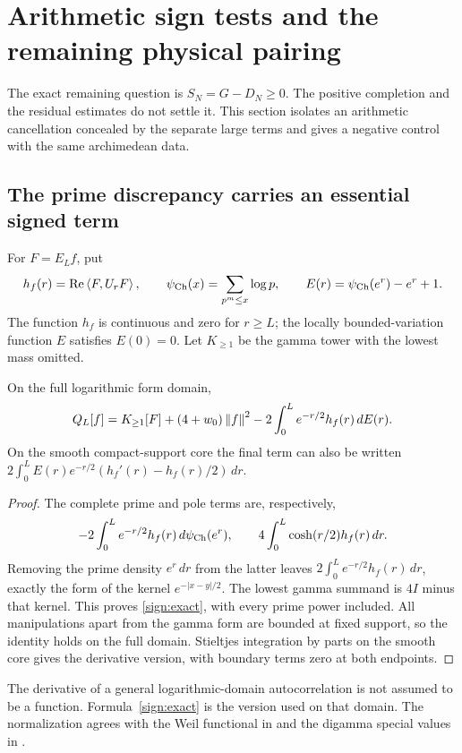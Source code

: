 \section{Arithmetic sign tests and the remaining physical pairing}
\label{sec:outlook}
The exact remaining question is $S_N=G-D_N\ge0$. The positive
completion and the residual estimates do not settle it. This section
isolates an arithmetic cancellation concealed by the separate large
terms and gives a negative control with the same archimedean data.

\subsection{The prime discrepancy carries an essential signed term}
For $F=E_Lf$, put
\[
h_f(r)=\operatorname{Re}\left\langle F,U_rF\right\rangle,\qquad
\psi_{\rm Ch}(x)=\sum_{p^m\le x}\log p,\qquad
E(r)=\psi_{\rm Ch}(e^r)-e^r+1.
\]
The function $h_f$ is continuous and zero for $r\ge L$; the locally
bounded-variation function $E$ satisfies $E(0)=0$.
Let $K_{\ge1}$ be the gamma tower with the lowest mass omitted.

\begin{proposition}\label{sign:discrepancy}
On the full logarithmic form domain,
\begin{equation}\label{sign:exact}
Q_L[f]=K_{\ge1}[F]+(4+w_0)\left\lVert f\right\rVert^2
       -2\int_0^L e^{-r/2}h_f(r)\,dE(r).
\end{equation}
On the smooth compact-support core the final term can also be written
$2\int_0^L E(r)e^{-r/2}(h_f'(r)-h_f(r)/2)\,dr$.
\end{proposition}
\begin{proof}
The complete prime and pole terms are, respectively,
\[
-2\int_0^Le^{-r/2}h_f(r)\,d\psi_{\rm Ch}(e^r),\qquad
4\int_0^L\cosh(r/2)h_f(r)\,dr.
\]
Removing the prime density $e^r\,dr$ from the latter leaves
$2\int_0^Le^{-r/2}h_f(r)\,dr$, exactly the form of the kernel
$e^{-|x-y|/2}$. The lowest gamma summand is $4I$ minus that kernel.
This proves \eqref{sign:exact}, with every prime power included.
All manipulations apart from the gamma form are bounded at fixed
support, so the identity holds on the full domain. Stieltjes
integration by parts on the smooth core gives the derivative
version, with boundary terms zero at both endpoints.
\end{proof}
The derivative of a general logarithmic-domain autocorrelation is
not assumed to be a function. Formula~\eqref{sign:exact} is the
version used on that domain. The normalization agrees with the
Weil functional in \cite[Section 1.1]{Suzuki} and the digamma
special values in \cite{DLMF}.

